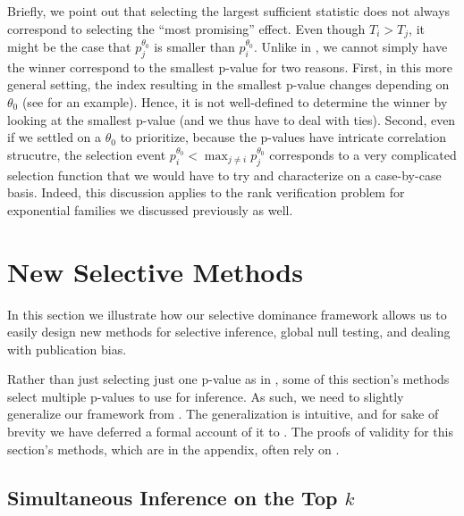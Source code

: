 \documentclass{article}
\begin{document}
Briefly, we point out that selecting the largest sufficient statistic does not always correspond to selecting the ``most promising'' effect. Even though $T_i > T_j$, it might be the case that $p^{\theta_0}_{j}$ is smaller than $p^{\theta_0}_{i}$.  Unlike in , we cannot simply have the winner correspond to the smallest p-value for two reasons. First, in this more general setting, the index resulting in the smallest p-value changes depending on $\theta_0$ (see  for an example). Hence, it is not well-defined to determine the winner by looking at the smallest p-value (and we thus have to deal with ties). Second, even if we settled on a $\theta_0$ to prioritize, because the p-values have intricate correlation strucutre, the selection event $p^{\theta_0}_{i} < \max_{j \neq i} p^{\theta_0}_{j}$ corresponds to a very complicated selection function that we would have to try and characterize on a case-by-case basis. Indeed, this discussion applies to the rank verification problem for exponential families we discussed previously as well. 

\section{New Selective Methods}

In this section we illustrate how our selective dominance framework allows us to easily design new methods for selective inference, global null testing, and dealing with publication bias.   

Rather than just selecting just one p-value as in , some of this section's methods select multiple p-values to use for inference. As such, we need to slightly generalize our framework from . The generalization is intuitive, and for sake of brevity we have deferred a formal account of it to . The proofs of validity for this section's methods, which are in the appendix, often rely on . 

\subsection{Simultaneous Inference on the Top $k$}
\end{document}
